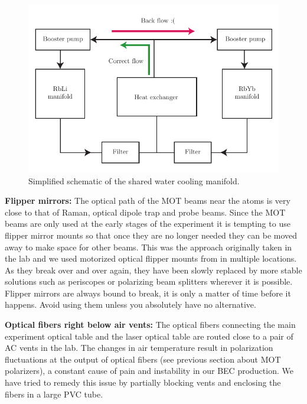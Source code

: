 \begin{figure}[htb]
\begin{center}
\includegraphics[]{Figures/Chapter4/water_cooling.pdf}
\caption[Water cooling manifold schematic]{Simplified schematic of the shared water cooling manifold.}
\label{fig:water_cooling}
\end{center}
\end{figure}

{\bf Flipper mirrors:} The optical path of the MOT beams near the atoms is very close to that of Raman, optical dipole trap and probe beams. Since the MOT beams are only used at the early stages of the experiment it is tempting to use flipper mirror mounts so that once they are no longer needed they can be moved away to make space for other beams. This was the approach originally taken in the lab and we used  motorized optical flipper mounts from  in multiple locations. As they break over and over again, they have been slowly replaced by more stable solutions such as periscopes or polarizing beam splitters wherever it is possible. Flipper mirrors are always bound to break, it is only a matter of time before it happens. Avoid using them unless you absolutely have no alternative. 

{\bf Optical fibers right below air vents:} The optical fibers connecting the main experiment optical table and the laser optical table are routed close to a pair of AC vents in the lab. The changes in air temperature result in polarization fluctuations at the output of optical fibers (see previous section about MOT polarizers), a constant cause of pain and instability in our BEC production. We have tried to remedy this issue by partially blocking vents and enclosing the fibers in a large PVC tube. 

